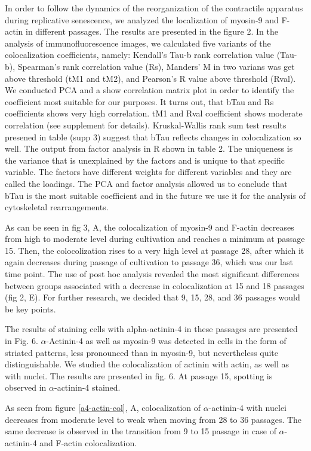 \documentclass[alpha-refs]{wiley-article}
\begin{document}
In order to follow the dynamics of the reorganization of the contractile apparatus during replicative senescence, we analyzed the localization of myosin-9 and F-actin in different passages.
The results are presented in the figure 2.
In the analysis of immunofluorescence images, we calculated five variants of the colocalization coefficients, namely: Kendall's Tau-b rank correlation value (Tau-b), Spearman's rank correlation value (Rs), Manders' M in two varians was get above threshold (tM1 and tM2), and Pearson's R value above threshold (Rval).
We conducted PCA and a show correlation matrix plot in order to identify the coefficient most suitable for our purposes.
It turns out, that bTau and Rs coefficients shows very high correlation.
tM1 and Rval coefficient shows moderate correlation (see supplement for details).
Kruskal-Wallis rank sum test results presened in table (supp 3) suggest that bTau reflects changes in colocalization so well.
The output from factor analysis in R shown in table 2.
The uniqueness is the variance that is unexplained by the factors and is unique to that specific variable.
The factors have different weights for different variables and they are called the loadings.
The PCA and factor analysis allowed us to conclude that bTau is the most suitable coefficient and in the future we use it for the analysis of cytoskeletal rearrangements.


As can be seen in fig 3, A, the colocalization of myosin-9 and F-actin decreases from high to moderate level during cultivation and reaches a minimum at passage 15.
Then, the colocolization rises to a very high level at passage 28, after which it again decreases during passage of cultivation to passage 36, which was our last time point.
The use of post hoc analysis revealed the most significant differences between groups associated with a decrease in colocalization at 15 and 18 passages (fig 2, E).
For further research, we decided that 9, 15, 28, and 36 passages would be key points.


The results of staining cells with alpha-actinin-4 in these passages are presented in Fig. 6.
$\alpha$-Actinin-4 as well as myosin-9 was detected in cells in the form of striated patterns, less pronounced than in myosin-9, but nevertheless quite distinguishable.
We studied the colocalization of actinin with actin, as well as with nuclei.
The results are presented in fig. 6.
At passage 15, spotting is observed in $\alpha$-actinin-4 stained.


As seen from figure \ref{a4-actin-col}, A, colocalization of $\alpha$-actinin-4 with nuclei decreases from moderate level to weak when moving from 28 to 36 passages.
The same decrease is observed in the transition from 9 to 15 passage in case of $\alpha$-actinin-4 and F-actin colocalization.
\end{document}
